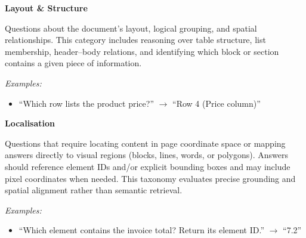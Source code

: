 \begin{tcolorbox}[prompt_structural, title= Structural  QA Taxonomy]
\textbf{Layout \& Structure}

Questions about the document's layout, logical grouping, and spatial relationships.
This category includes reasoning over table structure, list membership, header–body relations,
and identifying which block or section contains a given piece of information.

\medskip
\textit{Examples:}

\begin{itemize}
  \item ``Which row lists the product price?'' $\rightarrow$ ``Row 4 (Price column)''
\end{itemize}

\vspace{6pt}
\textbf{Localisation}

Questions that require locating content in page coordinate space or mapping answers
directly to visual regions (blocks, lines, words, or polygons). Answers should reference
element IDs and/or explicit bounding boxes and may include pixel coordinates when needed.
This taxonomy evaluates precise grounding and spatial alignment rather than semantic retrieval.

\medskip
\textit{Examples:}
\begin{itemize}

  \item ``Which element contains the invoice total? Return its element ID.'' $\rightarrow$ ``7.2''

\end{itemize}
\end{tcolorbox}


